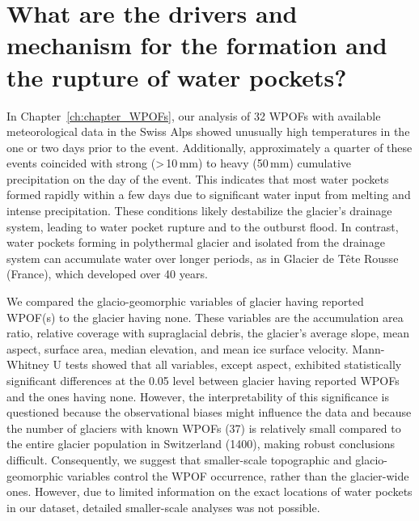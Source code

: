 \section{What are the drivers and mechanism for the formation and the rupture of water pockets?}

In Chapter~\ref{ch:chapter_WPOFs}, our analysis of 32 WPOFs with available meteorological data in the Swiss Alps showed unusually high temperatures in the one or two days prior to the event. Additionally, approximately a quarter of these events coincided with strong (>\,10\,mm) to heavy (50\,mm) cumulative precipitation on the day of the event. This indicates that most water pockets formed rapidly within a few days due to significant water input from melting and intense precipitation. These conditions likely destabilize the glacier's drainage system, leading to water pocket rupture and to the outburst flood. In contrast, water pockets forming in polythermal glacier and isolated from the drainage system can accumulate water over longer periods, as in Glacier de Tête Rousse (France), which developed over 40 years.  
%

We compared the glacio-geomorphic variables of glacier having reported WPOF(s) to the glacier having none. These variables are the accumulation area ratio, relative coverage with supraglacial debris, the glacier's average slope, mean aspect, surface area, median elevation, and mean ice surface velocity. Mann-Whitney U tests showed that all variables, except aspect, exhibited statistically significant differences at the 0.05 level between glacier having reported WPOFs and the ones having none. However, the interpretability of this significance is questioned because the observational biases might influence the data and because the number of glaciers with known WPOFs (37) is relatively small compared to the entire glacier population in Switzerland (1400), making robust conclusions difficult. Consequently, we suggest that smaller-scale topographic and glacio-geomorphic variables control the WPOF occurrence, rather than the glacier-wide ones. However, due to limited information on the exact locations of water pockets in our dataset, detailed smaller-scale analyses was not possible. 
%


